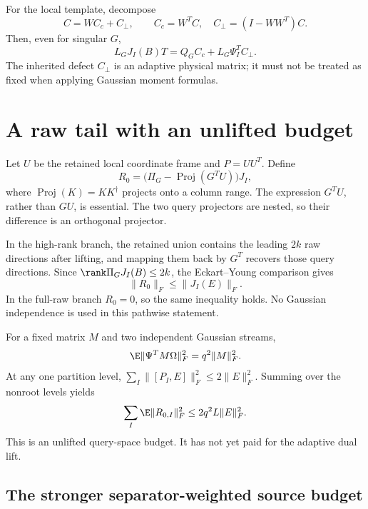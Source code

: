 \documentclass[11pt,oneside,openany,a4paper]{book}
\numberwithin{equation}{chapter}
\theoremstyle{definition}
\theoremstyle{remark}
\begin{document}
For the local template, decompose
\[
 C=WC_c+C_\perp,\qquad C_c=W^TC,
 \quad C_\perp=(I-WW^T)C.
\]
Then, even for singular $G$,
\begin{equation}
 L_GJ_I(B)T=Q_GC_c+L_G\Psi_I^TC_\perp.
 \label{upd:eq:route-separated-signal}
\end{equation}
The inherited defect $C_\perp$ is an adaptive physical matrix; it must
not be treated as fixed when applying Gaussian moment formulas.

\section{A raw tail with an unlifted budget}

Let $U$ be the retained local coordinate frame and $P=UU^T$.  Define
\begin{equation}
 R_0=\bigl(\Pi_G-\operatorname{Proj}(G^TU)\bigr)J_I,
 \label{upd:eq:route-raw-tail}
\end{equation}
where $\operatorname{Proj}(K)=KK^\dagger$ projects onto a column range.
The expression $G^TU$, rather than $GU$, is essential.  The two query
projectors are nested, so their difference is an orthogonal projector.

In the high-rank branch, the retained union contains the leading $2k$
raw directions after lifting, and mapping them back by $G^T$ recovers
those query directions.  Since $\rank\Pi_GJ_I(B)\leq2k$, the
Eckart--Young comparison gives
\begin{equation}
 \lVert R_0\rVert_F\leq\lVert J_I(E)\rVert_F.
 \label{upd:eq:route-unweighted-tail}
\end{equation}
In the full-raw branch $R_0=0$, so the same inequality holds.  No
Gaussian independence is used in this pathwise statement.

For a fixed matrix $M$ and two independent Gaussian streams,
\[
 \E\lVert\Psi^TM\Omega\rVert_F^2=q^2\lVert M\rVert_F^2.
\]
At any one partition level,
$\sum_I\lVert[P_I,E]\rVert_F^2\leq2\lVert E\rVert_F^2$.
Summing over the nonroot levels yields
\begin{equation}
 \sum_I\E\lVert R_{0,I}\rVert_F^2
 \leq2q^2L\lVert E\rVert_F^2.
 \label{upd:eq:route-unweighted-global}
\end{equation}
This is an unlifted query-space budget.  It has not yet paid for the
adaptive dual lift.

\subsection{The stronger separator-weighted source budget}
\end{document}

